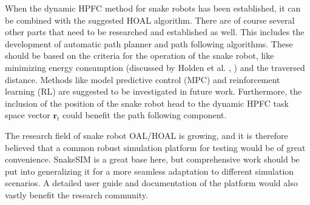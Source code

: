 
When the dynamic HPFC method for snake robots has been established, it can be combined with the suggested HOAL algorithm. There are of course several other parts that need to be researched and established as well. This includes the development of automatic path planner and path following algorithms. These should be based on the criteria for the operation of the snake robot, like minimizing energy consumption (discussed by Holden et al. \cite{holden2013optimal}, \cite{holden2014optimal}) and the traversed distance. Methods like model predictive control (MPC) and reinforcement learning (RL) are suggested to be investigated in future work. Furthermore, the inclusion of the position of the snake robot head to the dynamic HPFC task space vector $\mathbf{r}_t$ could benefit the path following component.

The research field of snake robot OAL/HOAL is growing, and it is therefore believed that a common robust simulation platform for testing would be of great convenience. SnakeSIM is a great base here, but comprehensive work should be put into generalizing it for a more seamless adaptation to different simulation scenarios. A detailed user guide and documentation of the platform would also vastly benefit the research community.